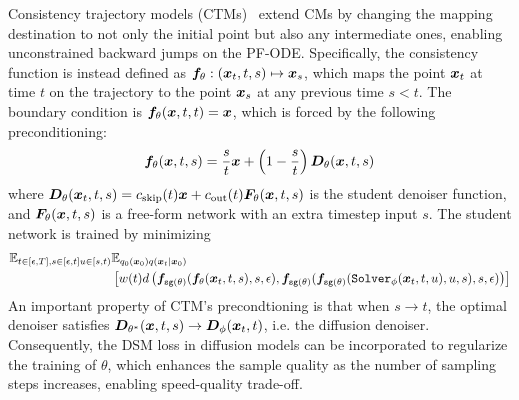 Consistency trajectory models (CTMs)~\citep{kim2023consistency} extend CMs by changing the mapping destination to not only the initial point but also any intermediate ones, enabling unconstrained backward jumps on the PF-ODE. Specifically, the consistency function is instead defined as $\bm{f}_\theta: (\bm{x}_t, t,s) \mapsto \bm{x}_{s}$, which maps the point $\bm{x}_t$ at time $t$ on the trajectory to the point $\bm{x}_s$ at any previous time $s<t$. The boundary condition is $\bm{f}_\theta(\bm{x},t,t)=\bm{x}$, which is forced by the following preconditioning:
\begin{equation}
\label{eq:ctm-precond}
    \bm{f}_\theta(\bm{x},t,s)=\frac{s}{t}\bm{x}+\left(1-\frac{s}{t}\right)\bm{D}_\theta(\bm{x},t,s)
\end{equation}
where $\bm{D}_\theta(\bm{x}_t,t,s)=c_{\text{skip}}(t)\bm{x}+c_{\text{out}}(t)\bm{F}_\theta(\bm{x},t,s)$ is the student denoiser function, and $\bm{F}_\theta(\bm{x},t,s)$ is a free-form network with an extra timestep input $s$. The student network is trained by minimizing
\begin{equation}
\begin{aligned}
    \label{eq:loss-ctm}\mathbb{E}_{t\in[\epsilon,T],s\in[\epsilon,t]u\in [s,t)}&\mathbb{E}_{q_0(\bm{x}_0)q(\bm{x}_t|\bm{x}_0)}\\
    &\left[w(t)d\left(\bm{f}_{\texttt{sg}(\theta)}(\bm{f}_{\theta}(\bm{x}_t, t,s),s,\epsilon),\bm{f}_{\texttt{sg}(\theta)}(\bm{f}_{\texttt{sg}(\theta)}(\texttt{Solver}_\phi(\bm{x}_t,t,u),u,s),s,\epsilon)\right)\right]
\end{aligned}
\end{equation}
An important property of CTM's precondtioning is that when $s\rightarrow t$, the optimal denoiser satisfies $\bm{D}_{\theta^*}(\bm{x},t,s)\rightarrow \bm{D}_\phi(\bm{x}_t,t)$, i.e. the diffusion denoiser. Consequently, the DSM loss in diffusion models can be incorporated to regularize the training of $\theta$, which enhances the sample quality as the number of sampling steps increases, enabling speed-quality trade-off.